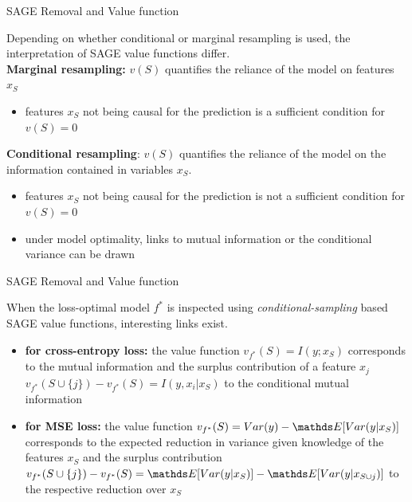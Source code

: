 \documentclass[11pt,compress,t,notes=noshow, aspectratio=169, xcolor=table]{beamer}
\begin{document}
\begin{frame}{SAGE Removal and Value function}

Depending on whether conditional or marginal resampling is used, the interpretation of SAGE value functions differ.\\
\lz
\textbf{Marginal resampling:} $v(S)$ quantifies the reliance of the model on features $x_S$
\begin{itemize}
  \item features $x_S$ not being causal for the prediction is a sufficient condition for $v(S) = 0$
\end{itemize}

\textbf{Conditional resampling}: $v(S)$ quantifies the reliance of the model on the information contained in variables $x_S$.
\begin{itemize}
  \item features $x_S$ not being causal for the prediction is not a sufficient condition for $v(S) = 0$
  \item under model optimality, links to mutual information or the conditional variance can be drawn
\end{itemize}

\end{frame}

\begin{frame}{SAGE Removal and Value function}

When the loss-optimal model $f^*$ is inspected using \textit{conditional-sampling} based SAGE value functions, interesting links exist.
\begin{itemize}
  \item \textbf{for cross-entropy loss:} the value function $v_{f^*}(S) = I(y;x_S)$ corresponds to the mutual information and the surplus contribution of a feature $x_j$ $v_{f^*}(S \cup \{j\}) - v_{f^*}(S) = I(y,x_i|x_S)$ to the conditional mutual information
  \item \textbf{for MSE loss:} the value function $v_{f^*}(S) = Var(y) - \E[Var(y|x_S)]$ corresponds to the expected reduction in variance given knowledge of the features $x_S$ and the surplus contribution $v_{f^*}(S \cup \{j\}) - v_{f^*}(S) = \E[Var(y|x_S)] - \E[Var(y|x_{S \cup {j}})]$ to the respective reduction over $x_S$
\end{itemize}
\end{frame}
\end{document}
